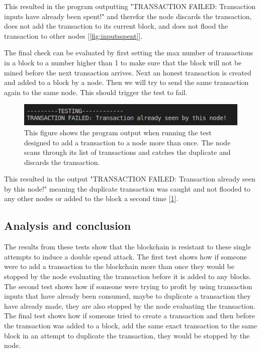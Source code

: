 \documentclass{l4proj}
\begin{document}
This resulted in the program outputting "TRANSACTION FAILED: Transaction inputs have already been spent!" and
therefor the node discards the transaction, does not add the transaction to its current block, and does not flood
the transaction to other nodes [\ref{fig:inputsspent}].

The final check can be evaluated by first setting the max number of transactions in a block to a number higher than
1 to make sure that the block will not be mined before the next transaction arrives. Next an honest transaction is 
created and added to a block by a node. Then we will try to send the same transaction again to the same node. This
should trigger the test to fail.

\begin{figure}[!ht]
    \centering
    \includegraphics[width=1\linewidth]{images/seenbynode.png}    
    \caption
    {
        This figure shows the program output when running the test designed to add a transaction to a node more than
        once. The node scans through its list of transactions and catches the duplicate and discards the transaction.
    }
    \label{fig:seenbynode} 
\end{figure}

This resulted in the output "TRANSACTION FAILED: Transaction already seen by this node!" meaning the duplicate
transaction was caught and not flooded to any other nodes or added to the block a second time [\ref{fig:seenbynode}].

\subsection{Analysis and conclusion}
The results from these tests show that the blockchain is resistant to these single attempts to induce a double spend
attack. The first test shows how if someone were to add a transaction to the blockchain more than once they would
be stopped by the node evaluating the transaction before it is added to any blocks. The second test shows how if
someone were trying to profit by using transaction inputs that have already been consumed, maybe to duplicate a
transaction they have already made, they are also stopped by the node evaluating the transaction. The final test
shows how if someone tried to create a transaction and then before the transaction was added to a block, add the same
exact transaction to the same block in an attempt to duplicate the transaction, they would be stopped by the node.
\end{document}
